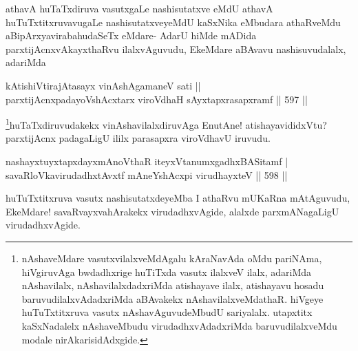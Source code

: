 \begin{artha}
athavA huTaTxdiruva vasutxgaLe nashisutatxve eMdU athavA huTuTxtitxruvavugaLe nashisutatxveyeMdU kaSxNika eMbudara athaRveMdu aBipArxyavirabahudaSeTx eMdare- AdarU hiMde mADida parxtijAcnxvAkayxthaRvu ilalxvAguvudu, EkeMdare aBAvavu nashisuvudalalx, adariMda
\end{artha}


\begin{shl}
kA\s tishiVtirajAtasayx vinAshAgamaneV sati ||  \\
parxtijAcnxpadayoVshAcxtarx viroVdhaH sAyxtapxrasapxramf \hfill||  597 ||  
\end{shl}

\begin{artha}
\footnote[1]{nAshaveMdare vasutxvilalxveMdAgalu kAraNavAda oMdu pariNAma, hiVgiruvAga bwdadhxrige huTiTxda vasutx ilalxveV ilalx, adariMda nAshavilalx, nAshavilalxdadxriMda atishayave ilalx, atishayavu hosadu baruvudilalxvAdadxriMda aBAvakekx nAshavilalxveMdathaR. hiVgeye huTuTxtitxruva vasutx nAshavAguvudeMbudU sariyalalx. utapxtitx kaSxNadalelx nAshaveMbudu virudadhxvAdadxriMda baruvudilalxveMdu modale nirAkarisidAdxgide.}huTaTxdiruvudakekx vinAshavilalxdiruvAga EnutAne! atishayavididxVtu? parxtijAcnx padagaLigU ililx parasapxra viroVdhavU iruvudu.
\end{artha}


\begin{shl}
\footnotemark[2]nashayxtuyxtapxdayxmAnoV\s thaR iteyxVtanumxgadhxBASitamf | \\
savaRloVkavirudadhxtAvxtf \footnotemark[3]mAneYshAcxpi virudhayxteV \hfill||  598 ||  
\end{shl}

\begin{artha}
huTuTxtitxruva vasutx nashisutatxdeyeMba I athaRvu mUKaRna mAtAguvudu, EkeMdare! savaRvayxvahArakekx virudadhxvAgide, alalxde parxmANagaLigU virudadhxvAgide.
\end{artha}

